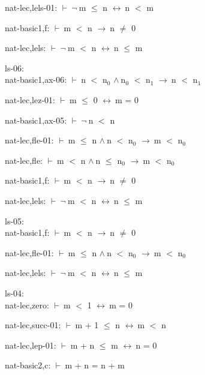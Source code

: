 \documentclass[a4paper]{article}
\newcommand{\Fol}{\mbox{$\vdash\ $}}
\newcommand{\Not}{\mbox{$\neg\ $}}
\newcommand{\And}{\mbox{$\wedge\ $}}
\newcommand{\Imp}{\mbox{$\rightarrow\ $}}
\newcommand{\Equiv}{\mbox{$\leftrightarrow\ $}}
\begin{document}
nat-lec,lels-01: 
 \Fol \Not m $\le$ n \Equiv n $<$ m



nat-basic1,f: 
 \Fol m $<$ n \Imp n $\neq$ 0



nat-lec,lels: 
 \Fol \Not m $<$ n \Equiv n $\le$ m



\bigskip

ls-06:\\ nat-basic1,ax-06: 
 \Fol n $<$ $\mbox{n}_{0}$ \And $\mbox{n}_{0}$ $<$ $\mbox{n}_{1}$ \Imp n $<$ $\mbox{n}_{1}$

nat-lec,lez-01: 
 \Fol m $\le$ 0 \Equiv m = 0



nat-basic1,ax-05: 
 \Fol \Not n $<$ n



nat-lec,fle-01: 
 \Fol m $\le$ n \And n $<$ $\mbox{n}_{0}$ \Imp m $<$ $\mbox{n}_{0}$



nat-lec,fle: 
 \Fol m $<$ n \And n $\le$ $\mbox{n}_{0}$ \Imp m $<$ $\mbox{n}_{0}$



nat-basic1,f: 
 \Fol m $<$ n \Imp n $\neq$ 0



nat-lec,lels: 
 \Fol \Not m $<$ n \Equiv n $\le$ m



\bigskip

ls-05:\\ nat-basic1,f: 
 \Fol m $<$ n \Imp n $\neq$ 0



nat-lec,fle-01: 
 \Fol m $\le$ n \And n $<$ $\mbox{n}_{0}$ \Imp m $<$ $\mbox{n}_{0}$



nat-lec,lels: 
 \Fol \Not m $<$ n \Equiv n $\le$ m



\bigskip

ls-04:\\ nat-lec,zero: 
 \Fol m $<$ 1 \Equiv m = 0



nat-lec,succ-01: 
 \Fol m + 1 $\le$ n \Equiv m $<$ n



nat-lec,lep-01: 
 \Fol m + n $\le$ m \Equiv n = 0



nat-basic2,c: 
 \Fol m + n = n + m
\end{document}
